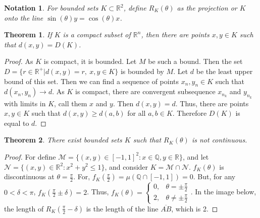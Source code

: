 \documentclass[oneside]{book}
\theoremstyle{mystyle}
\newtheorem{theorem}{Theorem}[section]
\newtheorem{notation}{Notation}[section]
\begin{document}
\begin{notation}
For bounded sets $K\subset \mathbb{R}^2$, define $R_K(\theta)$ as the projection or $K$ onto the line $\sin(\theta)y=\cos(\theta)x$.
\end{notation}

\begin{theorem}
If $K$ is a compact subset of $\mathbb{R}^n$, then there are points $x,y\in K$ such that $d(x,y)=D(K)$.
\end{theorem}
\begin{proof}
As $K$ is compact, it is bounded. Let $M$ be such a bound. Then the set $D=\{r\in \mathbb{R}^+| d(x,y) = r,\ x,y\in K\}$ is bounded by $M$. Let $d$ be the least upper bound of this set. Then we can find a sequence of points $x_n,y_n\in K$ such that $d(x_n,y_n) \rightarrow d$. As $K$ is compact, there are convergent subsequence $x_{n_k}$ and $y_{n_k}$ with limits in $K$, call them $x$ and $y$. Then $d(x,y) = d$. Thus, there are points $x,y\in K$ such that $d(x,y) \geq d(a,b)$ for all $a,b\in K$. Therefore $D(K)$ is equal to $d$.
\end{proof}

\begin{theorem}
There exist bounded sets $K$ such that $R_K(\theta)$ is not continuous.
\end{theorem}
\begin{proof}
For define $\mathcal{M} = \{(x,y)\in [-1,1]^2: x\in \mathbb{Q},y\in \mathbb{R}\}$, and let $\mathcal{N} = \{(x,y)\in \mathbb{R}^2: x^2+y^2\leq 1\}$, and consider $K = \mathcal{M}\cap \mathcal{N}$. $f_{K}(\theta)$ is discontinuous at $\theta = \frac{\pi}{2}$. For, $f_K(\frac{\pi}{2}) = \mu(\mathbb{Q}\cap [-1,1])=0$. But, for any $0<\delta < \pi$, $f_K(\frac{\pi}{2}\pm\delta) = 2$. Thus, $f_K(\theta) = \begin{cases} 0, & \theta = \pm \frac{\pi}{2} \\ 2, & \theta \ne \pm \frac{\pi}{2}\end{cases}$. In the image below, the length of $R_K(\frac{\pi}{2}-\delta)$ is the length of the line $\overline{AB}$, which is 2.
\end{proof}
\end{document}
